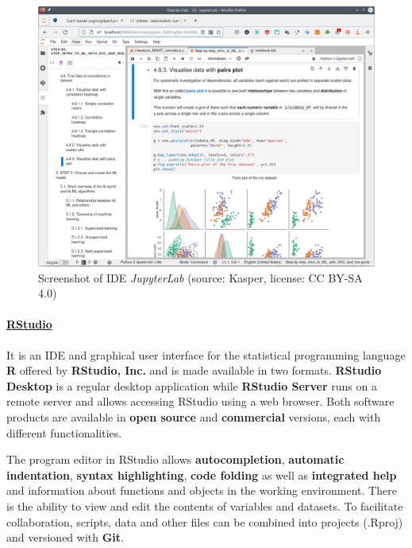 \documentclass [oneside,10pt,a4paper,ngerman,BCOR10mm,headsepline,parindent,final]{scrartcl}
\begin{document}
\begin{figure}
\centering
\includegraphics{images/Screenshot_JupyterLab.png}
\caption{Screenshot of IDE \emph{JupyterLab} (source: Kasper, license:
CC BY-SA 4.0)}
\end{figure}

    \hypertarget{rstudio}{%
\paragraph{\texorpdfstring{\href{https://en.wikipedia.org/wiki/RStudio}{RStudio}}{RStudio}}\label{rstudio}}

It is an IDE and graphical user interface for the statistical
programming language \textbf{R} offered by \textbf{RStudio, Inc.} and is
made available in two formats. \textbf{RStudio Desktop} is a regular
desktop application while \textbf{RStudio Server} runs on a remote
server and allows accessing RStudio using a web browser. Both software
products are available in \textbf{open source} and \textbf{commercial}
versions, each with different functionalities.

The program editor in RStudio allows \textbf{autocompletion},
\textbf{automatic indentation}, \textbf{syntax highlighting},
\textbf{code folding} as well as \textbf{integrated help} and
information about functions and objects in the working environment.
There is the ability to view and edit the contents of variables and
datasets. To facilitate collaboration, scripts, data and other files can
be combined into projects (.Rproj) and versioned with \textbf{Git}.
\end{document}
